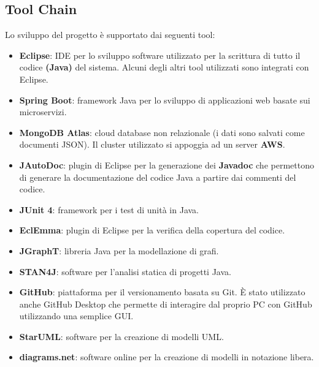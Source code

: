 \subsection{Tool Chain}
Lo sviluppo del progetto è supportato dai seguenti tool:

\begin{itemize}
    \item \textbf{Eclipse}: IDE per lo sviluppo software utilizzato per la scrittura di tutto il codice \textbf{(Java)} del sistema. Alcuni degli altri tool utilizzati sono integrati con Eclipse.
    \item \textbf{Spring Boot}: framework Java per lo sviluppo di applicazioni web basate sui microservizi.
    \item \textbf{MongoDB Atlas}: cloud database non relazionale (i dati sono salvati come documenti JSON). Il cluster utilizzato si appoggia ad un server \textbf{AWS}.
    \item \textbf{JAutoDoc}: plugin di Eclipse per la generazione dei \textbf{Javadoc} che permettono di generare la documentazione del codice Java a partire dai commenti del codice.
    \item \textbf{JUnit 4}: framework per i test di unità in Java.
    \item \textbf{EclEmma}: plugin di Eclipse per la verifica della copertura del codice.
    \item \textbf{JGraphT}: libreria Java per la modellazione di grafi.
    \item \textbf{STAN4J}: software per l’analisi statica di progetti Java.
    \item \textbf{GitHub}: piattaforma per il versionamento basata su Git. È stato utilizzato anche GitHub Desktop che permette di interagire dal proprio PC con GitHub utilizzando una semplice GUI.
    \item \textbf{StarUML}: software per la creazione di modelli UML.
    \item \textbf{diagrams.net}: software online per la creazione di modelli in notazione libera.
\end{itemize}